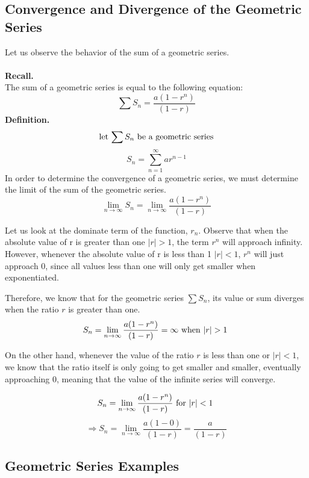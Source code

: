 \documentclass{report}
\begin{document}
\begin{sloppypar}
\subsection{Convergence and Divergence of the Geometric Series}
      Let us observe the behavior of the sum of a geometric series.
      \\
      \\
      \textbf{Recall.}
      \\

      The sum of a geometric series is equal to the following equation:
      \[ \sum S_{n} = \frac{a(1-r^{n})}{(1-r)}\]
      \textbf{Definition.}
      \[ \textrm{let $ \sum S_{n} $ be a geometric series} \]
      \[ S_{n} = \sum_{n=1}^{\infty} ar^{n-1} \]
      In order to determine the convergence of a geometric series,
      we must determine the limit of the sum  of the geometric series.
      \[ \lim_{n \rightarrow \infty}  S_{n} = \lim_{n \rightarrow \infty} \frac{a(1-r^{n})}{(1-r)} \]

      Let us look at the dominate term of the function, $ r_{n} $. Observe
      that when the absolute value of r is greater than one  $ | r| > 1$, the term $ r^{n} $
      will approach infinity. However, whenever the absolute value of r is
      less than 1 $ | r| < 1$, $r^{n}$ will just approach 0, since all values less than one will
      only get smaller when exponentiated.

      Therefore, we know that for the geometric series $ \sum S_{n} $, its value or sum diverges
      when the ratio $ r $ is greater than one.
      \[ S_{n} = \lim_{n \rightarrow \infty} \frac{a(1-r^{n})}{(1-r)} = \infty \textrm{ when $ | r| > 1 $ } \]

      On the other hand, whenever the value of the ratio $ r $ is less than one or $ | r| < 1 $, we know
      that the ratio itself is only going to get smaller and smaller, eventually approaching 0, meaning
      that the value of the infinite series will converge.

      \[ S_{n} = \lim_{n \rightarrow \infty} \frac{a(1-r^{n})}{(1-r)} \textrm{ for $ |r| < 1$  }\]
      \[ \Rightarrow S_{n} = \lim_{n \rightarrow \infty} \frac{a(1-0)}{(1-r)} = \frac{a}{(1-r)}\]



\subsection{Geometric Series Examples}

\end{sloppypar}
\end{document}
